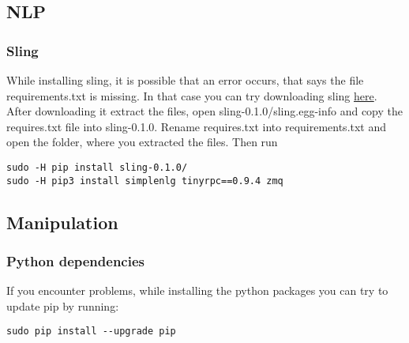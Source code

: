 \documentclass[main.tex]{subfiles}
\begin{document}
	\subsection{NLP}
	\subsubsection{Sling}
	While installing sling, it is possible that an error occurs, that says the file requirements.txt is missing. In that case you can try downloading sling \href{https://pypi.org/project/sling/#files}{here}. After downloading it extract the files, open sling-0.1.0/sling.egg-info and copy the requires.txt file into sling-0.1.0. Rename requires.txt into requirements.txt and open the folder, where you extracted the files. Then run \\
	\begin{lstlisting}
sudo -H pip install sling-0.1.0/
sudo -H pip3 install simplenlg tinyrpc==0.9.4 zmq
\end{lstlisting}
	
	\subsection{Manipulation}
	\subsubsection{Python dependencies}
	If you encounter problems, while installing the python packages you can try to update pip by running:\\
	\begin{lstlisting}
sudo pip install --upgrade pip
\end{lstlisting}	
	
\end{document}
